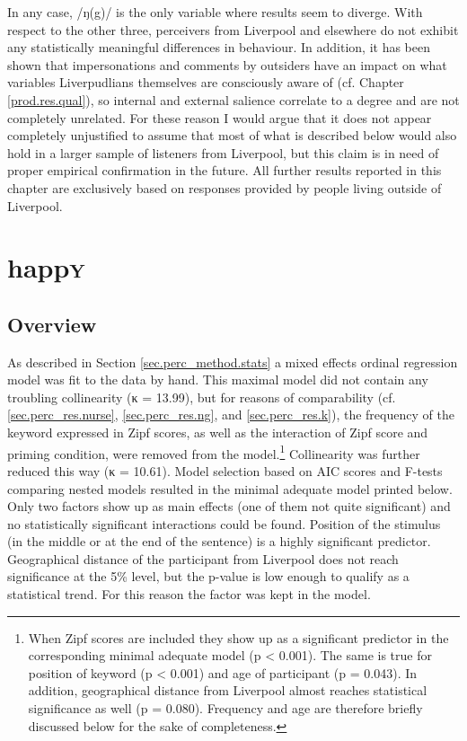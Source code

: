 In any case, /ŋ(g)/ is the only variable where results seem to diverge.
With respect to the other three, perceivers from Liverpool and elsewhere do not exhibit any statistically meaningful differences in behaviour.
In addition, it has been shown that impersonations and comments by outsiders have an impact on what variables Liverpudlians themselves are consciously aware of (cf. Chapter \ref{prod.res.qual}), so internal and external salience correlate to a degree and are not completely unrelated.
For these reason I would argue that it does not appear completely unjustified to assume that most of what is described below would also hold in a larger sample of listeners from Liverpool, but this claim is in need of proper empirical confirmation in the future.
All further results reported in this chapter are exclusively based on responses provided by people living outside of Liverpool.

\section{happ\textrm{\textsc{y}}}
\label{sec.perc_res.happy}
	\subsection{Overview}
	\label{sec.perc_res.happy.overview}

As described in Section \ref{sec.perc_method.stats} a mixed effects ordinal regression model was fit to the data by hand.
This maximal model did not contain any troubling collinearity (κ = 13.99), but for reasons of comparability (cf. \ref{sec.perc_res.nurse}, \ref{sec.perc_res.ng}, and \ref{sec.perc_res.k}), the frequency of the keyword expressed in Zipf scores, as well as the interaction of Zipf score and priming condition, were removed from the model.\footnote{When Zipf scores are included they show up as a significant predictor in the corresponding minimal adequate model (p < 0.001). The same is true for position of keyword (p < 0.001) and age of participant (p = 0.043). In addition, geographical distance from Liverpool almost reaches statistical significance as well (p = 0.080). Frequency and age are therefore briefly discussed below for the sake of completeness.}
Collinearity was further reduced this way (κ = 10.61).
Model selection based on AIC scores and F-tests comparing nested models resulted in the minimal adequate model printed below.
Only two factors show up as main effects (one of them not quite significant) and no statistically significant interactions could be found.
Position of the stimulus (in the middle or at the end of the sentence) is a highly significant predictor.
Geographical distance of the participant from Liverpool does not reach significance at the 5\% level, but the p-value is low enough to qualify as a statistical trend.
For this reason the factor was kept in the model.

